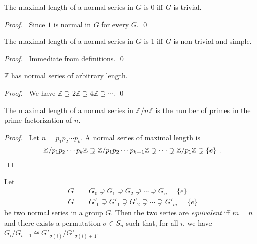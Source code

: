 \begin{prop}
The maximal length of a normal series in $G$ is 0 iff $G$ is trivial.
\end{prop}

\begin{proof}
\pf\ Since $1$ is normal in $G$ for every $G$. \qed
\end{proof}

\begin{prop}
The maximal length of a normal series in $G$ is 1 iff $G$ is non-trivial and simple.
\end{prop}

\begin{proof}
\pf\ Immediate from definitions. \qed
\end{proof}

\begin{ex}
$\mathbb{Z}$ has normal series of arbitrary length.
\end{ex}

\begin{proof}
\pf\ We have $\mathbb{Z} \supsetneq 2 \mathbb{Z} \supsetneq 4 \mathbb{Z} \supsetneq \cdots$. \qed
\end{proof}

\begin{ex}
The maximal length of a normal series in $\mathbb{Z} / n \mathbb{Z}$ is the number of primes in the prime factorization of $n$.
\end{ex}

\begin{proof}
\pf\ Let $n = p_1 p_2 \cdots p_k$. A normal series of maximal length is
\[ \mathbb{Z} / p_1 p_2 \cdots p_k \mathbb{Z} \supsetneq \mathbb{Z} / p_1 p_2 \cdots p_{k-1} \mathbb{Z} \supsetneq \cdots \supsetneq \mathbb{Z} / p_1 \mathbb{Z} \supsetneq \{e\} \enspace . \qed \]
\end{proof}

\begin{df}
Let
\begin{align*}
G & = G_0 \supsetneq G_1 \supsetneq G_2 \supsetneq \cdots \supsetneq G_n = \{e\} \\
G & = G'_0 \supsetneq G'_1 \supsetneq G'_2 \supsetneq \cdots \supsetneq G'_m = \{e\}
\end{align*}
be two normal series in a group $G$. Then the two series are \emph{equivalent} iff $m = n$ and there exists a permutation $\sigma \in S_n$ such that, for all $i$, we have $G_i / G_{i+1} \cong G'_{\sigma(i)} / G'_{\sigma(i) + 1}$.
\end{df}

